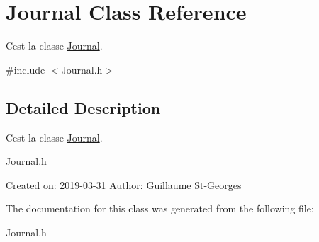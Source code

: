\hypertarget{classJournal}{}\section{Journal Class Reference}
\label{classJournal}


C\textquotesingle{}est la classe \hyperlink{classJournal}{Journal}.  




{\ttfamily \#include $<$Journal.\+h$>$}



\subsection{Detailed Description}
C\textquotesingle{}est la classe \hyperlink{classJournal}{Journal}. 

\hyperlink{Journal_8h_source}{Journal.\+h}

Created on\+: 2019-\/03-\/31 Author\+: Guillaume St-\/\+Georges 

The documentation for this class was generated from the following file\+:\begin{DoxyCompactItemize}
\item 
Journal.\+h\end{DoxyCompactItemize}
